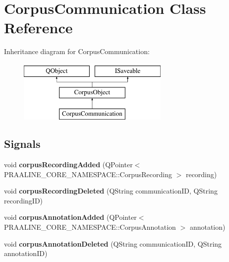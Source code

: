\hypertarget{class_corpus_communication}{}\section{Corpus\+Communication Class Reference}
\label{class_corpus_communication}
Inheritance diagram for Corpus\+Communication\+:\begin{figure}[H]
\begin{center}
\leavevmode
\includegraphics[height=3.000000cm]{class_corpus_communication}
\end{center}
\end{figure}
\subsection*{Signals}
\begin{DoxyCompactItemize}
\item 
\mbox{\label{class_corpus_communication_a8048c2cd61bada85b866023c553dd32e}} 
void {\bfseries corpus\+Recording\+Added} (Q\+Pointer$<$ P\+R\+A\+A\+L\+I\+N\+E\+\_\+\+C\+O\+R\+E\+\_\+\+N\+A\+M\+E\+S\+P\+A\+C\+E\+::\+Corpus\+Recording $>$ recording)
\item 
\mbox{\label{class_corpus_communication_a696e92bbff3d1c317aee4c9cfb6bce9f}} 
void {\bfseries corpus\+Recording\+Deleted} (Q\+String communication\+ID, Q\+String recording\+ID)
\item 
\mbox{\label{class_corpus_communication_a1eda96f1b582b8d7e4094b9a53faa587}} 
void {\bfseries corpus\+Annotation\+Added} (Q\+Pointer$<$ P\+R\+A\+A\+L\+I\+N\+E\+\_\+\+C\+O\+R\+E\+\_\+\+N\+A\+M\+E\+S\+P\+A\+C\+E\+::\+Corpus\+Annotation $>$ annotation)
\item 
\mbox{\label{class_corpus_communication_a71c1c6deb1c74bf06d9fc15e78b174db}} 
void {\bfseries corpus\+Annotation\+Deleted} (Q\+String communication\+ID, Q\+String annotation\+ID)
\end{DoxyCompactItemize}
